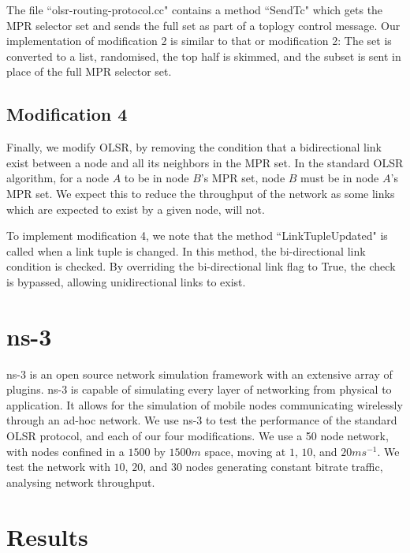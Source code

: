 \documentclass[12pt,a4paper]{article}
\begin{document}
The file ``olsr-routing-protocol.cc" contains a method ``SendTc" which gets the MPR selector set and sends the full set as part of a toplogy control message. Our implementation of modification 2 is similar to that or modification 2: The set is converted to a list, randomised, the top half is skimmed, and the subset is sent in place of the full MPR selector set.

\subsection{Modification 4}
Finally, we modify OLSR, by removing the condition that a bidirectional link exist between a node and all its neighbors in the MPR set. In the standard OLSR algorithm, for a node \(A\) to be in node \(B\)'s MPR set, node \(B\) must be in node \(A\)'s MPR set. We expect this to reduce the throughput of the network as some links which are expected to exist by a given node, will not.

To implement modification 4, we note that the method ``LinkTupleUpdated" is called when a link tuple is changed. In this method, the bi-directional link condition is checked. By overriding the bi-directional link flag to True, the check is bypassed, allowing unidirectional links to exist.

\section{ns-3}
ns-3 is an open source network simulation framework with an extensive array of plugins. ns-3 is capable of simulating every layer of networking from physical to application. It allows for the simulation of mobile nodes communicating wirelessly through an ad-hoc network. We use ns-3 to test the performance of the standard OLSR protocol, and each of our four modifications. We use a 50 node network, with nodes confined in a \(1500\) by \(1500m\) space, moving at \(1\), \(10\), and \(20ms^{-1}\). We test the network with \(10\), \(20\), and \(30\) nodes generating constant bitrate traffic, analysing network throughput.

\pagebreak
\section{Results}
\end{document}
